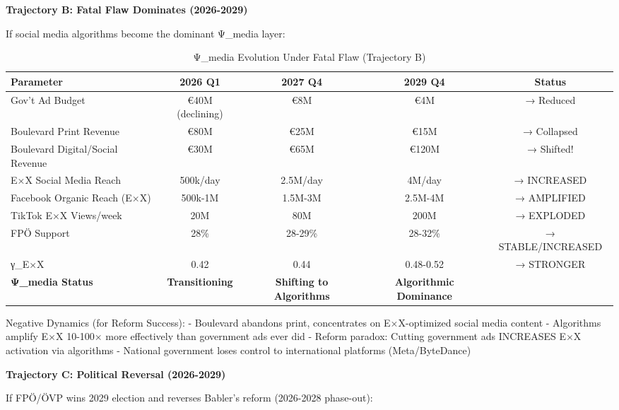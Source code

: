 \vspace{0.3cm}

\textbf{Trajectory B: Fatal Flaw Dominates (2026-2029)}

If social media algorithms become the dominant Ψ_media layer:

\begin{table}[h]
\centering
\caption{Ψ_media Evolution Under Fatal Flaw (Trajectory B)}
\label{tab:dx-psi-trajectory-b}
\begin{tabular}{|l|c|c|c|c|}
\hline
\textbf{Parameter} & \textbf{2026 Q1} & \textbf{2027 Q4} & \textbf{2029 Q4} & \textbf{Status} \\
\hline
Gov't Ad Budget & €40M (declining) & €8M & €4M & → Reduced \\
Boulevard Print Revenue & €80M & €25M & €15M & → Collapsed \\
Boulevard Digital/Social Revenue & €30M & €65M & €120M & → Shifted! \\
E×X Social Media Reach & 500k/day & 2.5M/day & 4M/day & → INCREASED \\
Facebook Organic Reach (E×X) & 500k-1M & 1.5M-3M & 2.5M-4M & → AMPLIFIED \\
TikTok E×X Views/week & 20M & 80M & 200M & → EXPLODED \\
FPÖ Support & 28\% & 28-29\% & 28-32\% & → STABLE/INCREASED \\
γ_{E×X} & 0.42 & 0.44 & 0.48-0.52 & → STRONGER \\
\hline
\textbf{Ψ_media Status} & \textbf{Transitioning} & \textbf{Shifting to Algorithms} & \textbf{Algorithmic Dominance} & \\
\hline
\end{tabular}
\end{table}

Negative Dynamics (for Reform Success):
- Boulevard abandons print, concentrates on E×X-optimized social media content
- Algorithms amplify E×X 10-100× more effectively than government ads ever did
- Reform paradox: Cutting government ads INCREASES E×X activation via algorithms
- National government loses control to international platforms (Meta/ByteDance)

\vspace{0.3cm}

\textbf{Trajectory C: Political Reversal (2026-2029)}

If FPÖ/ÖVP wins 2029 election and reverses Babler's reform (2026-2028 phase-out):

